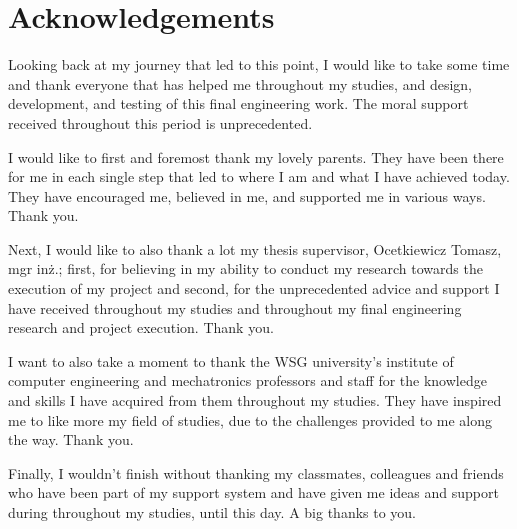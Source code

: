 \cleardoublepage

\section*{\centering \Large Acknowledgements}

\begin{acknowledgements}

    Looking back at my journey that led to this point, I would like to take some time and thank everyone that has helped me throughout my studies, and design, development, and testing of this final engineering work. The moral support received throughout this period is unprecedented.

    I would like to first and foremost thank my lovely parents. They have been there for me in each single step that led to where I am and what I have achieved today. They have encouraged me, believed in me, and supported me in various ways. Thank you.

    Next, I would like to also thank a lot my thesis supervisor, Ocetkiewicz Tomasz, mgr inż.; first, for believing in my ability to conduct my research towards the execution of my project and second, for the unprecedented advice and support I have received throughout my studies and throughout my final engineering research and project execution. Thank you.

    I want to also take a moment to thank the WSG university’s institute of computer engineering and mechatronics professors and staff for the knowledge and skills I have acquired from them throughout my studies. They have inspired me to like more my field of studies, due to the challenges provided to me along the way. Thank you.

    Finally, I wouldn’t finish without thanking my classmates, colleagues and friends who have been part of my support system and have given me ideas and support during throughout my studies, until this day. A big thanks to you.


\end{acknowledgements}

